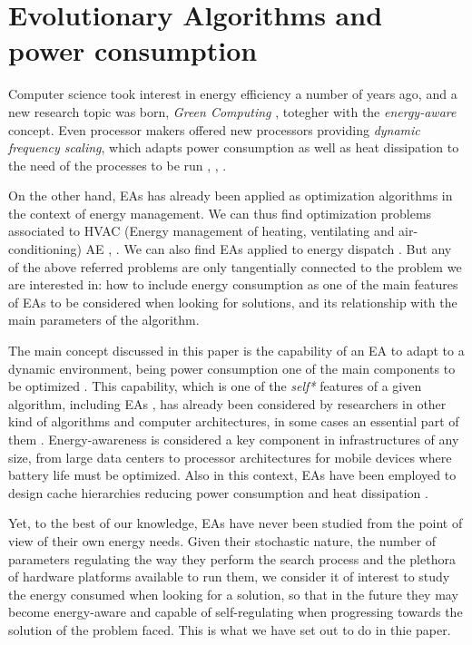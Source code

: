 \section{Evolutionary Algorithms and power consumption}
\label{eas}

Computer science took interest in energy efficiency a number of years
ago, and a new research topic was born, \textit{Green Computing}
\cite{green-computing}, totegher with the \textit{energy-aware}
\cite{energiaware,energy-aware} concept. Even processor 
makers offered new processors providing \textit{dynamic frequency
  scaling}, which adapts power consumption as well as heat dissipation
to the need of the processes to be run \cite{scaling},
\cite{dynamic-scaling}, \cite{energy-efficient}. 

On the other hand, EAs has already been applied as optimization
algorithms in the context of energy management.  We can thus find
optimization problems associated to HVAC (Energy management of
heating, ventilating and air-conditioning) AE \cite{HVAC},
\cite{chiller}.  We can also find EAs applied to energy dispatch
\cite{dispatch}.  But any of the above referred problems are only
tangentially connected to the problem we are interested in:  how to
include energy consumption as one of the main features of EAs to be
considered when looking for solutions, and its relationship with the
main parameters of the algorithm. 

The main concept discussed in this paper is the capability of an EA to adapt
to a dynamic environment, being power consumption one of the main
components to be optimized \cite{ephemeral}. This capability, which
is one of the \textit{self*} features of a
given algorithm, including EAs \cite{self}, has already been
considered by researchers in other kind of algorithms and computer architectures, in some cases
an essential part of them \cite{energy-aware}. Energy-awareness is
considered a key
component in infrastructures of any size, from large data centers to
processor architectures for mobile devices where battery life must be
optimized.  Also in this context, EAs have been employed to design
cache hierarchies reducing power consumption and heat dissipation
\cite{cache}. 

Yet, to the best of our knowledge, EAs have never been studied from
the point of view of their own energy needs. 
Given their stochastic nature, the number of parameters regulating the
way they perform the search process and the plethora of hardware
platforms available to run them, we consider it of interest to study
the energy consumed when looking for a solution, so that in the future
they may become energy-aware and capable of self-regulating when
progressing towards the solution of the problem faced. This is what we
have set out to do in thie paper.

